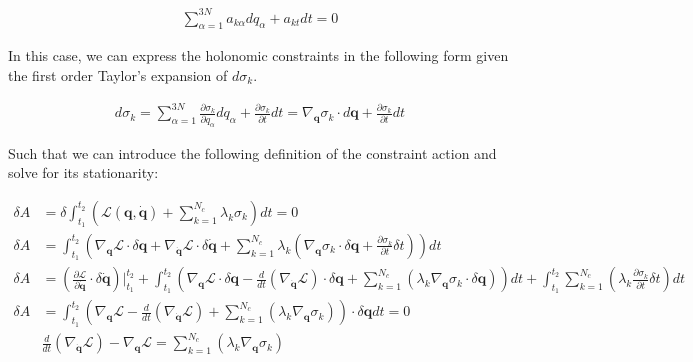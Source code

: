\documentclass[draft]{agujournal2019}
\begin{document}
\begin{definition}
\begin{align*}
    \sum_{\alpha = 1}^{3N} a_{k\alpha} dq_\alpha + a_{kt}dt = 0
\end{align*}

In this case, we can express the holonomic constraints in the following form given the first order Taylor's expansion of $d\sigma_k$.

\begin{align}
    d\sigma_k = \sum_{\alpha = 1}^{3N} \frac{\partial \sigma_k}{\partial q_\alpha} dq_\alpha + \frac{\partial \sigma_k}{\partial t} dt = \nabla_{\mathbf{q}} \sigma_k \cdot d\mathbf{q} + \frac{\partial \sigma_k}{\partial t} dt
\end{align}

Such that we can introduce the following definition of the constraint action and solve for its stationarity:

\begin{align*}
    \delta A &= \delta \int_{t_1}^{t_2} \left( \mathcal{L}(\mathbf{q}, \dot{\mathbf{q}}) + \sum_{k = 1}^{N_c} \lambda_k \sigma_k\right)dt = 0 \\
    \delta A &= \int_{t_1}^{t_2} \left(\nabla_{\mathbf{q}} \mathcal{L} \cdot \delta \mathbf{q} + \nabla_{\dot{\mathbf{q}}} \mathcal{L} \cdot \delta \dot{\mathbf{q}} + \sum_{k = 1}^{N_c} \lambda_k \left( \nabla_{\mathbf{q}} \sigma_k \cdot \delta \mathbf{q} + \frac{\partial \sigma_k}{\partial t} \delta t\right)\right) dt \\
    \delta A &= \left(\frac{\partial \mathcal{L}}{\partial \dot{\mathbf{q}}} \cdot \delta \dot{\mathbf{q}} \right)\Big\vert_{t_1}^{t_2} + \int_{t_1}^{t_2} \left( \nabla_\mathbf{q} \mathcal{L} \cdot \delta \mathbf{q} - \frac{d}{dt}\left( \nabla_{\dot{\mathbf{q}}} \mathcal{L}\right) \cdot \delta \mathbf{q} + \sum_{k = 1}^{N_c} \left( \lambda_k \nabla_{\mathbf{q}} \sigma_k \cdot \delta \mathbf{q}\right)\right) dt + \int_{t_1}^{t_2} \sum_{k = 1}^{N_c} \left( \lambda_k \frac{\partial \sigma_k}{\partial t} \delta t \right) dt \\
    \delta A &= \int_{t_1}^{t_2} \left( \nabla_\mathbf{q} \mathcal{L} - \frac{d}{dt}\left( \nabla_{\dot{\mathbf{q}}} \mathcal{L}\right) + \sum_{k = 1}^{N_c} \left( \lambda_k \nabla_{\mathbf{q}} \sigma_k \right)\right) \cdot \delta \mathbf{q} dt = 0 \\
    &\frac{d}{dt}\left( \nabla_{\dot{\mathbf{q}}} \mathcal{L}\right) - \nabla_\mathbf{q} \mathcal{L} = \sum_{k = 1}^{N_c} \left( \lambda_k \nabla_{\mathbf{q}} \sigma_k \right)
\end{align*}


\end{definition}
\end{document}

